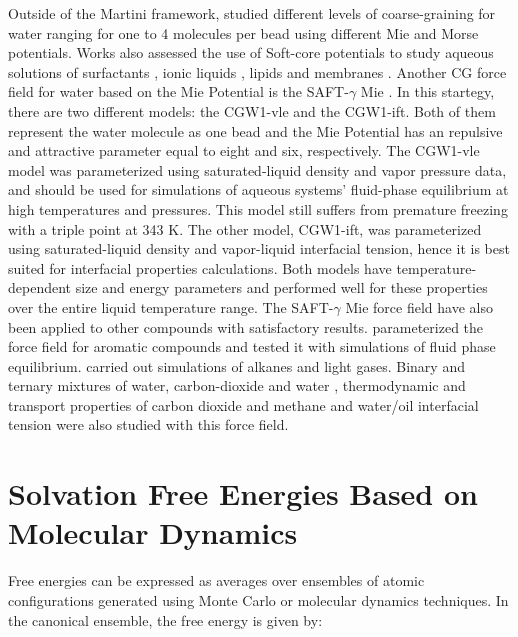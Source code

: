 Outside of the Martini framework,  studied different levels of coarse-graining for water ranging for one to 4 molecules per bead using different Mie and Morse potentials. Works also assessed the use of Soft-core potentials to study aqueous solutions of surfactants \cite{shinoda2007}, ionic liquids \cite{bhargava2009}, lipids \cite{shinoda20102} and membranes \cite{pantano2009}. Another CG force field for water based on the Mie Potential is the SAFT-$\gamma$ Mie \cite{lobanova2015}. In this startegy, there are two different models: the CGW1-vle and the CGW1-ift. Both of them represent the water molecule as one bead and  the Mie Potential has an repulsive and attractive parameter equal to eight and six, respectively. The CGW1-vle model was parameterized using saturated-liquid density and vapor pressure data, and should be used for simulations of aqueous systems' fluid-phase equilibrium at high temperatures and pressures. This model still suffers from premature freezing with a triple point at 343 K. The other model, CGW1-ift, was parameterized using saturated-liquid density and vapor-liquid interfacial tension, hence it is best suited for interfacial properties calculations. Both models have temperature-dependent size and energy parameters and performed well for these properties over the entire liquid temperature range. The SAFT-$\gamma$ Mie force field have also been applied to other compounds with satisfactory results.  parameterized the force field for aromatic compounds and tested it with simulations of fluid phase equilibrium.  carried out simulations of alkanes and light gases. Binary and ternary mixtures of water, carbon-dioxide and water \cite{lobanova2016}, thermodynamic and transport properties of carbon dioxide and methane \cite{cassiano1,cassiano2} and water/oil interfacial tension \cite{herdes2017} were also studied with this force field.  




\section{Solvation Free Energies Based on Molecular Dynamics}

Free energies can be expressed as averages over ensembles of atomic configurations generated using Monte Carlo or molecular dynamics techniques. In the canonical ensemble, the free energy is given by:  

